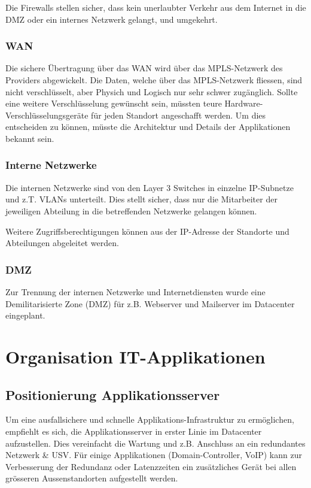 Die Firewalls stellen sicher, dass kein unerlaubter Verkehr aus dem Internet in die DMZ oder ein internes Netzwerk gelangt, und umgekehrt.

\subsubsection{WAN}
Die sichere Übertragung über das WAN wird über das MPLS-Netzwerk des Providers abgewickelt. Die Daten, welche über das MPLS-Netzwerk fliessen, sind nicht verschlüsselt, aber Physich und Logisch nur sehr schwer zugänglich. Sollte eine weitere Verschlüsselung gewünscht sein, müssten teure Hardware-Verschlüsselungsgeräte für jeden Standort angeschafft werden. Um dies entscheiden zu können, müsste die Architektur und Details der Applikationen bekannt sein.

\subsubsection{Interne Netzwerke}

Die internen Netzwerke sind von den Layer 3 Switches in einzelne IP-Subnetze und z.T. VLANs unterteilt. Dies stellt sicher, dass nur die Mitarbeiter der jeweiligen Abteilung in die betreffenden Netzwerke gelangen können.

Weitere Zugriffsberechtigungen können aus der IP-Adresse der Standorte und Abteilungen abgeleitet werden.

\subsubsection{DMZ}

Zur Trennung der internen Netzwerke und Internetdiensten wurde eine Demilitarisierte Zone (DMZ) für z.B. Webserver und Mailserver im Datacenter eingeplant.

\section{Organisation IT-Applikationen}

\subsection{Positionierung Applikationsserver}

Um eine ausfallsichere und schnelle Applikations-Infrastruktur zu ermöglichen, empfiehlt es sich, die Applikationsserver in erster Linie im Datacenter aufzustellen. Dies vereinfacht die Wartung und z.B. Anschluss an ein redundantes Netzwerk \& USV. Für einige Applikationen (Domain-Controller, VoIP) kann zur Verbesserung der Redundanz oder Latenzzeiten ein zusätzliches Gerät bei allen grösseren Aussenstandorten aufgestellt werden.

